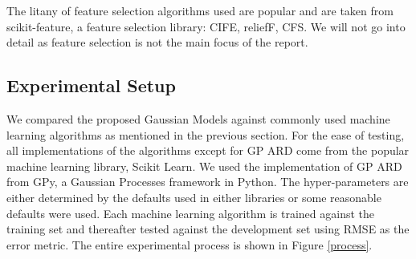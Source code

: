 \documentclass{article}
\begin{document}
	The litany of feature selection algorithms used are popular and are taken from scikit-feature, a feature selection library\cite{li2016feature}: CIFE\cite{Lin2006}, reliefF\cite{Rob2003}, CFS\cite{HALLHALL}. We will not go into detail as feature selection is not the main focus of the report.
	
	\subsection{Experimental Setup}
	We compared the proposed Gaussian Models against commonly used machine learning algorithms as mentioned in the previous section. For the ease of testing, all implementations of the algorithms except for GP ARD come from the popular machine learning library, Scikit Learn\cite{scikit-learn}. We used the 
	implementation of GP ARD from GPy, a Gaussian Processes framework in Python\cite{gpy2014}.
	The hyper-parameters are either determined by the defaults used in either libraries or some reasonable defaults were used.
	Each machine learning algorithm is trained against the training set and thereafter tested against the development set using RMSE as the error metric. 
	The entire experimental process is shown in Figure \ref{process}.
 

 	
\end{document}
